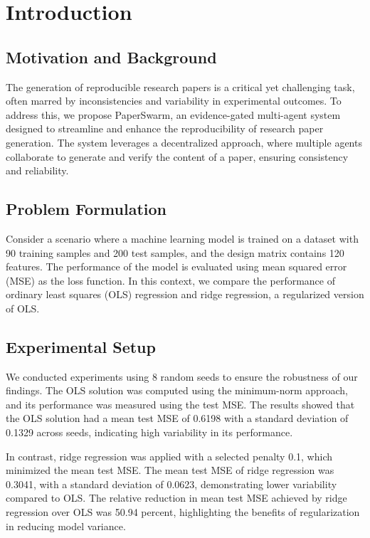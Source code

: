 \section{Introduction}

\subsection{Motivation and Background}

The generation of reproducible research papers is a critical yet challenging task, often marred by inconsistencies and variability in experimental outcomes. To address this, we propose PaperSwarm, an evidence-gated multi-agent system designed to streamline and enhance the reproducibility of research paper generation. The system leverages a decentralized approach, where multiple agents collaborate to generate and verify the content of a paper, ensuring consistency and reliability.

\subsection{Problem Formulation}

Consider a scenario where a machine learning model is trained on a dataset with 90 training samples and 200 test samples, and the design matrix contains 120 features. The performance of the model is evaluated using mean squared error (MSE) as the loss function. In this context, we compare the performance of ordinary least squares (OLS) regression and ridge regression, a regularized version of OLS.

\subsection{Experimental Setup}

We conducted experiments using 8 random seeds to ensure the robustness of our findings. The OLS solution was computed using the minimum-norm approach, and its performance was measured using the test MSE. The results showed that the OLS solution had a mean test MSE of 0.6198 with a standard deviation of 0.1329 across seeds, indicating high variability in its performance.

In contrast, ridge regression was applied with a selected penalty 0.1, which minimized the mean test MSE. The mean test MSE of ridge regression was 0.3041, with a standard deviation of 0.0623, demonstrating lower variability compared to OLS. The relative reduction in mean test MSE achieved by ridge regression over OLS was 50.94 percent, highlighting the benefits of regularization in reducing model variance.

